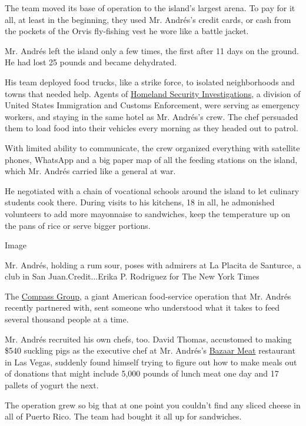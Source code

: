 The team moved its base of operation to the island's largest arena. To
pay for it all, at least in the beginning, they used Mr. Andrés's credit
cards, or cash from the pockets of the Orvis fly-fishing vest he wore
like a battle jacket.

Mr. Andrés left the island only a few times, the first after 11 days on
the ground. He had lost 25 pounds and became dehydrated.

His team deployed food trucks, like a strike force, to isolated
neighborhoods and towns that needed help. Agents of
\href{https://www.ice.gov/hsi}{Homeland Security Investigations}, a
division of United States Immigration and Customs Enforcement, were
serving as emergency workers, and staying in the same hotel as Mr.
Andrés's crew. The chef persuaded them to load food into their vehicles
every morning as they headed out to patrol.

With limited ability to communicate, the crew organized everything with
satellite phones, WhatsApp and a big paper map of all the feeding
stations on the island, which Mr. Andrés carried like a general at war.

He negotiated with a chain of vocational schools around the island to
let culinary students cook there. During visits to his kitchens, 18 in
all, he admonished volunteers to add more mayonnaise to sandwiches, keep
the temperature up on the pans of rice or serve bigger portions.

Image

Mr. Andrés, holding a rum sour, poses with admirers at La Placita de
Santurce, a club in San Juan.Credit...Erika P. Rodriguez for The New
York Times

The \href{http://www.compass-usa.com/}{Compass Group}, a giant American
food-service operation that Mr. Andrés recently partnered with, sent
someone who understood what it takes to feed several thousand people at
a time.

Mr. Andrés recruited his own chefs, too. David Thomas, accustomed to
making \$540 suckling pigs as the executive chef at Mr. Andrés's
\href{https://slslasvegas.com/restaurants-bars/bazaar-meat-by-jose-andres/}{Bazaar
Meat} restaurant in Las Vegas, suddenly found himself trying to figure
out how to make meals out of donations that might include 5,000 pounds
of lunch meat one day and 17 pallets of yogurt the next.

The operation grew so big that at one point you couldn't find any sliced
cheese in all of Puerto Rico. The team had bought it all up for
sandwiches.

